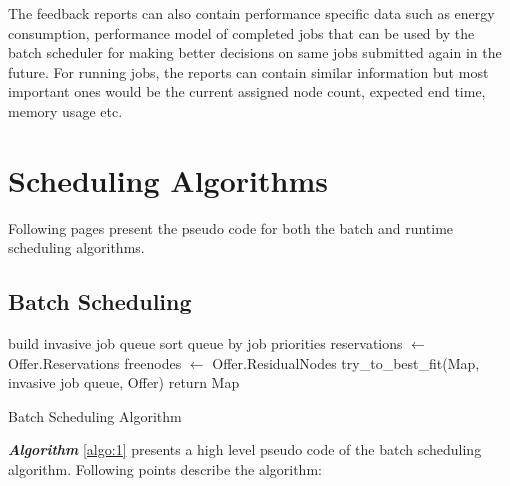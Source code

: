 The feedback reports can also contain performance specific data such as energy consumption, performance model of completed jobs that can be used by the batch scheduler for making better decisions on same jobs submitted again in the future. For running jobs, the reports can contain similar information but most important ones would be the current assigned node count, expected end time, memory usage etc.
\section{Scheduling Algorithms}
Following pages present the pseudo code for both the batch and runtime scheduling algorithms.
\subsection{Batch Scheduling}
\IncMargin{1em}
\begin{algorithm}[!htbp]
 \DontPrintSemicolon
 build invasive job queue\;
 sort queue by job priorities\;
 reservations $\leftarrow$ Offer.Reservations\;
 freenodes $\leftarrow$ Offer.ResidualNodes\;
 try\_to\_best\_fit(Map, invasive job queue, Offer)\;
 return Map\;
 \caption{Batch Scheduling Algorithm}
 \label{algo:1}
\end{algorithm}
\textbf{\textit{Algorithm }}\ref{algo:1} presents a high level pseudo code of the batch scheduling algorithm. Following points describe the algorithm:
